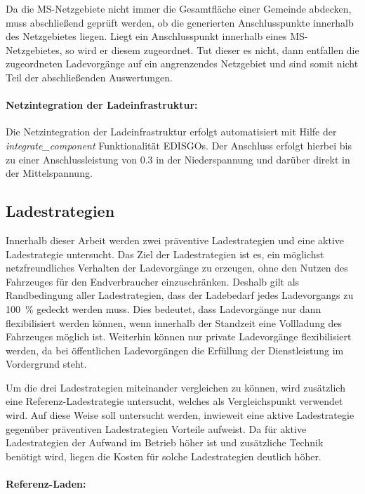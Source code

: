 Da die \gls{MS}-Netzgebiete nicht immer die Gesamtfläche einer Gemeinde abdecken, muss abschließend geprüft werden, ob die generierten Anschlusspunkte innerhalb des Netzgebietes liegen.
Liegt ein Anschlusspunkt innerhalb eines \gls{MS}-Netzgebietes, so wird er diesem zugeordnet.
Tut dieser es nicht, dann entfallen die zugeordneten Ladevorgänge auf ein angrenzendes Netzgebiet und sind somit nicht Teil der abschließenden Auswertungen.


\paragraph{Netzintegration der Ladeinfrastruktur:}

Die Netzintegration der Ladeinfrastruktur erfolgt automatisiert mit Hilfe der \textit{integrate\_component} Funktionalität \glspl{EDISGO}.
Der Anschluss erfolgt hierbei bis zu einer Anschlussleistung von \SI{0.3}{\mva} in der Niederspannung und darüber direkt in der Mittelspannung.


\subsection{Ladestrategien}\label{chap:theo_strategies}

Innerhalb dieser Arbeit werden zwei präventive Ladestrategien und eine aktive Ladestrategie untersucht.
Das Ziel der Ladestrategien ist es, ein möglichst netzfreundliches Verhalten der Ladevorgänge zu erzeugen, ohne den Nutzen des Fahrzeuges für den Endverbraucher einzuschränken.
Deshalb gilt als Randbedingung aller Ladestrategien, dass der Ladebedarf jedes Ladevorgangs zu \SI{100}{\percent} gedeckt werden muss.
Dies bedeutet, dass Ladevorgänge nur dann flexibilisiert werden können, wenn innerhalb der Standzeit eine Vollladung des Fahrzeuges möglich ist.
Weiterhin können nur private Ladevorgänge flexibilisiert werden, da bei öffentlichen Ladevorgängen die Erfüllung der Dienstleistung im Vordergrund steht.\medskip

Um die drei Ladestrategien miteinander vergleichen zu können, wird zusätzlich eine Referenz-Ladestrategie untersucht, welches als Vergleichspunkt verwendet wird.
Auf diese Weise soll untersucht werden, inwieweit eine aktive Ladestrategie gegenüber präventiven Ladestrategien Vorteile aufweist.
Da für aktive Ladestrategien der Aufwand im Betrieb höher ist und zusätzliche Technik benötigt wird, liegen die Kosten für solche Ladestrategien deutlich höher.


\paragraph{Referenz-Laden:}

